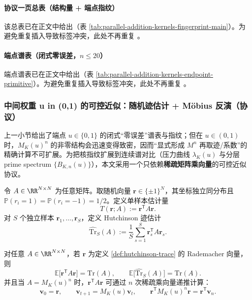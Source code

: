 \paragraph{协议一页总表（结构量 + 端点指纹）}
该总表已在正文中给出（表 \ref{tab:parallel-addition-kernels-fingerprint-main}）。为避免重复插入导致标签冲突，此处不再重复 \verb||。

\paragraph{端点谱表（闭式零误差，\texorpdfstring{$n\le 20$}{n<=20}）}
端点谱表已在正文中给出（表 \ref{tab:parallel-addition-kernels-endpoint-primitive}）。为避免重复插入导致标签冲突，此处不再重复 \verb||。

\subsubsection{中间权重 u in (0,1) 的可控近似：随机迹估计 + Möbius 反演（协议）}\label{app:kernel-fingerprint-hutchinson}
上一小节给出了端点 $u\in\{0,1\}$ 的闭式“零误差”谱表与指纹；但在 $u\in(0,1)$ 时，$M_K(u)^n$ 的非零结构会迅速变得致密，因而“显式形成 $M^n$ 再取迹/系数”的精确计算不可扩展。为把核指纹扩展到连续谱对比（压力曲线 $\lambda_K(u)$ 与分层 prime spectrum $\{B_{K,n}(u)\}$），本文采用一个只依赖\textbf{稀疏矩阵乘向量}的可控近似协议。

\begin{definition}\label{def:hutchinson-trace}
令 $A\in\RR^{N\times N}$ 为任意矩阵。取随机向量 $\mathbf r\in\{\pm 1\}^N$，其坐标独立同分布且 $\mathbb{P}(r_i=1)=\mathbb{P}(r_i=-1)=1/2$。定义单样本估计量
\[
T(\mathbf r;A):=\mathbf r^{\mathsf T}A\mathbf r.
\]
对 $S$ 个独立样本 $\mathbf r_1,\dots,\mathbf r_S$，定义 Hutchinson 迹估计
\[
\widehat{\mathrm{Tr}}_S(A):=\frac{1}{S}\sum_{s=1}^{S}\mathbf r_s^{\mathsf T}A\mathbf r_s.
\]
\end{definition}

\begin{proposition}[无偏性与矩阵自由实现]\label{prop:hutchinson-unbiased-mfree}
对任意 $A\in\RR^{N\times N}$，若 $\mathbf r$ 为定义 \ref{def:hutchinson-trace} 的 Rademacher 向量，则
\[
\mathbb{E}\bigl[\mathbf r^{\mathsf T}A\mathbf r\bigr]=\mathrm{Tr}(A),
\qquad
\mathbb{E}\bigl[\widehat{\mathrm{Tr}}_S(A)\bigr]=\mathrm{Tr}(A).
\]
并且当 $A=M_K(u)^n$ 时，$\mathbf r^{\mathsf T}A\mathbf r$ 可通过 $n$ 次稀疏乘向量递推计算：
\[
\mathbf v_0=\mathbf r,\qquad \mathbf v_{t+1}=M_K(u)\mathbf v_t,\qquad
\mathbf r^{\mathsf T}M_K(u)^n\mathbf r=\mathbf r^{\mathsf T}\mathbf v_n.
\]
\end{proposition}

